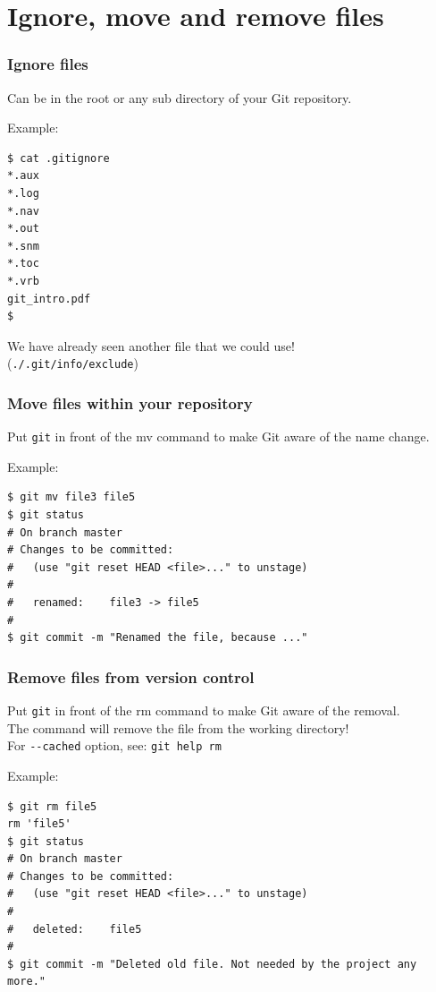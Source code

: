 \documentclass[handout,notes]{gittalk}
\newcommand{\hlcommand}[1]{ %
\colorbox{base3}{\small \texttt{#1}}
}
\begin{document}
\section{Ignore, move and remove files}

\begin{frame}[fragile]
\frametitle{Ignore files}
\begin{tcolorbox}[title=The .gitignore file]
Can be in the root or any sub directory of your Git repository.
\end{tcolorbox}
\vspace*{0.5em}
Example:
\begin{lstlisting}
$ cat .gitignore
*.aux
*.log
*.nav
*.out
*.snm
*.toc
*.vrb
git_intro.pdf
$
\end{lstlisting}
\vspace*{0.5em}
We have already seen another file that we could use!\\
(\texttt{./.git/info/exclude})
\end{frame}

\begin{frame}[fragile]
\frametitle{Move files within your repository}
\begin{tcolorbox}[title=git mv]
Put \texttt{git} in front of the mv command to make Git aware of the name change.
\end{tcolorbox}
\vspace*{0.5em}
Example:
\begin{lstlisting}
$ git mv file3 file5
$ git status
# On branch master
# Changes to be committed:
#   (use "git reset HEAD <file>..." to unstage)
#
#	renamed:    file3 -> file5
#
$ git commit -m "Renamed the file, because ..."
\end{lstlisting}
\end{frame}

\begin{frame}[fragile]
\frametitle{Remove files from version control}
\begin{tcolorbox}[title=git rm]
Put \texttt{git} in front of the rm command to make Git aware of the removal.\\[0.5em]
The command will remove the file from the working directory!\\
For \hlcommand{-{}-cached} option, see: \hlcommand{git help rm} 
\end{tcolorbox}
Example:
\begin{lstlisting}
$ git rm file5
rm 'file5'
$ git status
# On branch master
# Changes to be committed:
#   (use "git reset HEAD <file>..." to unstage)
#
#	deleted:    file5
#
$ git commit -m "Deleted old file. Not needed by the project any more."

\end{lstlisting}
\end{frame}
\end{document}
